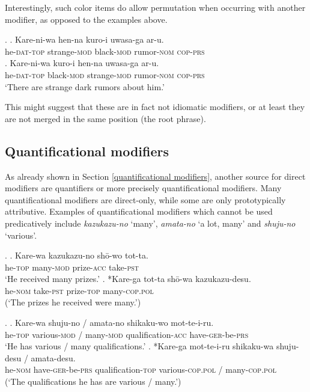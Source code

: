 Interestingly, such color items do allow permutation when occurring with another modifier, as opposed to the examples above.

\ex. \ag. Kare-ni-wa hen-na kuro-i uwasa-ga ar-u.\\
he-\textsc{dat-top} strange-\textsc{mod} black-\textsc{mod} rumor-\textsc{nom} \textsc{cop-prs}\\
\bg. Kare-ni-wa kuro-i hen-na uwasa-ga ar-u.\\
he-\textsc{dat-top} black-\textsc{mod} strange-\textsc{mod} rumor-\textsc{nom} \textsc{cop-prs}\\
`There are strange dark rumors about him.’

This might suggest that these are in fact not idiomatic modifiers, or at least they are not merged in the same position (the root phrase).

\subsection{Quantificational modifiers}

As already shown in Section \ref{quantificational modifiers}, another source for direct modifiers are quantifiers or more precisely quantificational modifiers. Many quantificational modifiers are direct-only, while some are only prototypically attributive. Examples of quantificational modifiers which cannot be used predicatively include \textit{kazukazu-no} `many’, \textit{amata-no} `a lot, many’ and \textit{shuju-no} `various’.

\ex. \ag. Kare-wa kazukazu-no shō-wo tot-ta.\\
he-\textsc{top} many-\textsc{mod} prize-\textsc{acc} take-\textsc{pst}\\
`He received many prizes.’
\bg. *Kare-ga tot-ta shō-wa kazukazu-desu.\\
he-\textsc{nom} take-\textsc{pst} prize-\textsc{top} many-\textsc{cop.pol}\\
(`The prizes he received were many.’)

\ex. \ag. Kare-wa shuju-no / amata-no shikaku-wo mot-te-i-ru.\\
he-\textsc{top} various-\textsc{mod} / many-\textsc{mod} qualification-\textsc{acc} have-\textsc{ger}-be-\textsc{prs}\\
`He has various / many qualifications.’
\bg. *Kare-ga mot-te-i-ru shikaku-wa shuju-desu / amata-desu.\\
he-\textsc{nom} have-\textsc{ger}-be-\textsc{prs} qualification-\textsc{top} various-\textsc{cop.pol} / many-\textsc{cop.pol}\\
(`The qualifications he has are various / many.’)

